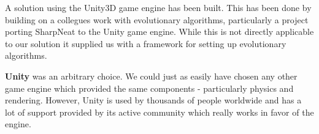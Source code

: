 A solution using the Unity3D\cite{web:unity} game engine has been built. This has been done by building on a collegues work\cite{web:unityneat} with evolutionary algorithms, particularly a project porting SharpNeat\cite{web:sharpneat} to the Unity game engine.
While this is not directly applicable to our solution it supplied us with a framework for setting up evolutionary algorithms.
    
\textbf{Unity} was an arbitrary choice. We could just as easily have chosen any other game engine which provided the same components - particularly physics and rendering. However, Unity is used by thousands of people worldwide and has a lot of support provided by its active community which really works in favor of the engine.

